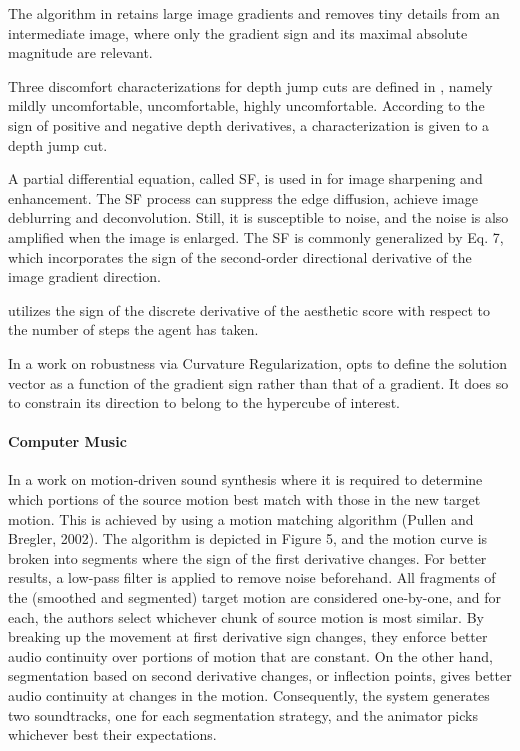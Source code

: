 \documentclass[11pt]{book}
\begin{document}
The algorithm in \cite{pan2016robust} retains large image gradients
and removes tiny details from an intermediate image, where only the
gradient sign and its maximal absolute magnitude are relevant.

Three discomfort characterizations for depth jump cuts are defined
in \cite{delis2016automatic}, namely \textquotedbl mildly uncomfortable\textquotedbl ,
\textquotedbl uncomfortable\textquotedbl , \textquotedbl highly uncomfortable\textquotedbl .
According to the sign of positive and negative depth derivatives,
a characterization is given to a depth jump cut.

A partial differential equation, called SF, is used in \cite{huang2017multi}
for image sharpening and enhancement. The SF process can suppress
the edge diffusion, achieve image deblurring and deconvolution. Still,
it is susceptible to noise, and the noise is also amplified when the
image is enlarged. The SF is commonly generalized by Eq. 7, which
incorporates the sign of the second-order directional derivative of
the image gradient direction.

\cite{li2018a2} utilizes the sign of the discrete derivative of the
aesthetic score with respect to the number of steps the agent has
taken.

In a work on robustness via Curvature Regularization, \cite{moosavi2019robustness} opts to define the solution vector as
a function of the gradient sign rather than that of a gradient. It
does so to constrain its direction to belong to the hypercube of interest.


\paragraph{Computer Music}

In a work on motion-driven sound synthesis \cite{cardle2003sound} where it is required to determine which portions
of the source motion best match with those in the new target motion.
This is achieved by using a motion matching algorithm (Pullen and
Bregler, 2002). The algorithm is depicted in Figure 5, and the motion
curve is broken into segments where the sign of the first derivative
changes. For better results, a low-pass filter is applied to remove
noise beforehand. All fragments of the (smoothed and segmented) target
motion are considered one-by-one, and for each, the authors select
whichever chunk of source motion is most similar. By breaking up the
movement at first derivative sign changes, they enforce better audio
continuity over portions of motion that are constant. On the other
hand, segmentation based on second derivative changes, or inflection
points, gives better audio continuity at changes in the motion. Consequently,
the system generates two soundtracks, one for each segmentation strategy,
and the animator picks whichever best their expectations.
\end{document}
